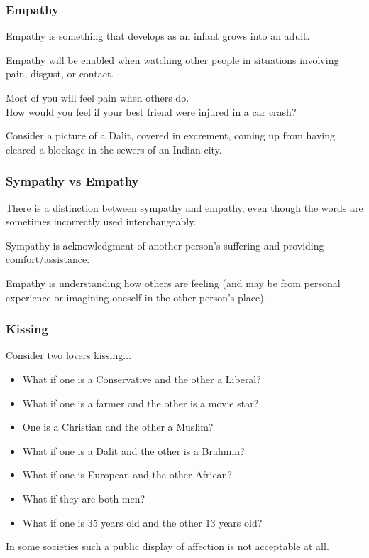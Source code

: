 \begin{frame}
\frametitle{Empathy}

Empathy is something that develops as an infant grows into an adult. 

Empathy will be enabled when watching other people in situations involving pain, disgust, or contact.

Most of you will feel pain when others do.\\
\quad How would you feel if your best friend were injured in a car crash?

Consider a picture of a Dalit, covered in excrement, coming up from having cleared a blockage in the sewers of an Indian city.

\end{frame}



\begin{frame}
\frametitle{Sympathy vs Empathy}

There is a distinction between sympathy and empathy, even though the words are sometimes incorrectly used interchangeably. 

Sympathy is acknowledgment of another person's suffering and providing comfort/assistance.

Empathy is understanding how others are feeling (and may be from personal experience or imagining oneself in the other person's place).


\end{frame}



\begin{frame}
\frametitle{Kissing}

Consider two lovers kissing...

\begin{itemize}
\item What if one is a Conservative and the other a Liberal?
\item What if one is a farmer and the other is a movie star?
\item One is a Christian and the other a Muslim?
\item What if one is a Dalit and the other is a Brahmin?
\item What if one is European and the other African?
\item What if they are both men?
\item What if one is 35 years old and the other 13 years old?
\end{itemize}

In some societies such a public display of affection is not acceptable at all.

\end{frame}



